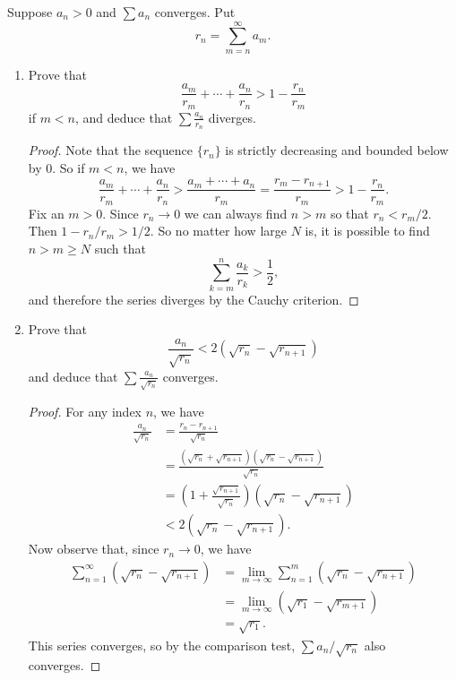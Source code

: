  Suppose $a_n > 0$ and $\sum a_n$ converges. Put
\begin{equation*}
  r_n = \sum_{m=n}^\infty a_m.
\end{equation*}
\begin{enumerate}
\item Prove that
  \begin{equation*}
    \frac{a_m}{r_m} + \cdots + \frac{a_n}{r_n} > 1 - \frac{r_n}{r_m}
  \end{equation*}
  if $m < n$, and deduce that $\sum\frac{a_n}{r_n}$ diverges.
  \begin{proof}
    Note that the sequence $\{r_n\}$ is strictly decreasing and
    bounded below by $0$. So if $m < n$, we have
    \begin{equation*}
      \frac{a_m}{r_m} + \cdots + \frac{a_n}{r_n}
      > \frac{a_m + \cdots + a_n}{r_m}
      = \frac{r_m - r_{n+1}}{r_m} > 1 - \frac{r_n}{r_m}.
    \end{equation*}
    Fix an $m > 0$. Since $r_n\to0$ we can always find $n > m$ so that
    $r_n < r_m/2$. Then $1 - r_n/r_m > 1/2$. So no matter how large
    $N$ is, it is possible to find $n>m\geq N$ such that
    \begin{equation*}
      \sum_{k=m}^n\frac{a_k}{r_k} > \frac12,
    \end{equation*}
    and therefore the series diverges by the Cauchy criterion.
  \end{proof}
\item Prove that
  \begin{equation*}
    \frac{a_n}{\sqrt{r_n}} < 2(\sqrt{r_n} - \sqrt{r_{n+1}})
  \end{equation*}
  and deduce that $\sum\frac{a_n}{\sqrt{r_n}}$ converges.
  \begin{proof}
    For any index $n$, we have
    \begin{align*}
      \frac{a_n}{\sqrt{r_n}}
      &= \frac{r_n - r_{n+1}}{\sqrt{r_n}} \\
      &= \frac{(\sqrt{r_n} + \sqrt{r_{n+1}})
        (\sqrt{r_n} - \sqrt{r_{n+1}})}{\sqrt{r_n}} \\
      &= \left(1 + \frac{\sqrt{r_{n+1}}}{\sqrt{r_n}}\right)
        (\sqrt{r_n} - \sqrt{r_{n+1}}) \\
      &< 2(\sqrt{r_n} - \sqrt{r_{n+1}}).
    \end{align*}
    Now observe that, since $r_n\to0$, we have
    \begin{align*}
      \sum_{n=1}^\infty(\sqrt{r_n} - \sqrt{r_{n+1}})
      &= \lim_{m\to\infty}\sum_{n=1}^m(\sqrt{r_n} - \sqrt{r_{n+1}}) \\
      &= \lim_{m\to\infty}(\sqrt{r_1} - \sqrt{r_{m+1}}) \\
      &= \sqrt{r_1}.
    \end{align*}
    This series converges, so by the comparison test,
    $\sum a_n/\sqrt{r_n}$ also converges.
  \end{proof}
\end{enumerate}
